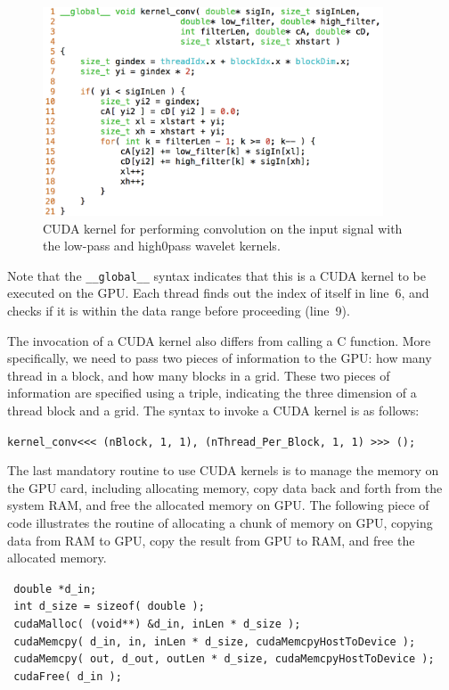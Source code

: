 \documentclass{article}
\begin{document}
\begin{figure}
    \centering
    \includegraphics[width=0.9\textwidth]{conv.png}
    \caption{CUDA kernel for performing convolution on the input signal
             with the low-pass and high0pass wavelet kernels.}
    \label{fig:conv1}
\end{figure}

Note that the \verb|__global__| syntax indicates that this is a CUDA kernel
to be executed on the GPU.
%
Each thread finds out the index of itself in line~6, and checks if it is
within the data range before proceeding (line~9).


The invocation of a CUDA kernel also differs from calling a C function.
%
More specifically, we need to pass two pieces of information to the GPU:
how many thread in a block, and how many blocks in a grid.
%
These two pieces of information are specified using a triple, indicating
the three dimension of a thread block and a grid.
%
The syntax to invoke a CUDA kernel is as follows:

\bigskip
\noindent \verb|kernel_conv<<< (nBlock, 1, 1), (nThread_Per_Block, 1, 1) >>> ();|
\bigskip

The last mandatory routine to use CUDA kernels is to manage the memory
on the GPU card, including allocating memory, copy data back and forth from
the system RAM, and free the allocated memory on GPU.
%
The following piece of code illustrates the routine of allocating a chunk of 
memory on GPU, copying data from RAM to GPU, copy the result from GPU to RAM,
and free the allocated memory.

\bigskip
\noindent \verb| double *d_in; | \\
\verb| int d_size = sizeof( double ); | \\
\verb| cudaMalloc( (void**) &d_in, inLen * d_size ); |    \\
\verb| cudaMemcpy( d_in, in, inLen * d_size, cudaMemcpyHostToDevice ); |\\
\verb| cudaMemcpy( out, d_out, outLen * d_size, cudaMemcpyHostToDevice ); |\\
\verb| cudaFree( d_in ); |
\bigskip
\end{document}
